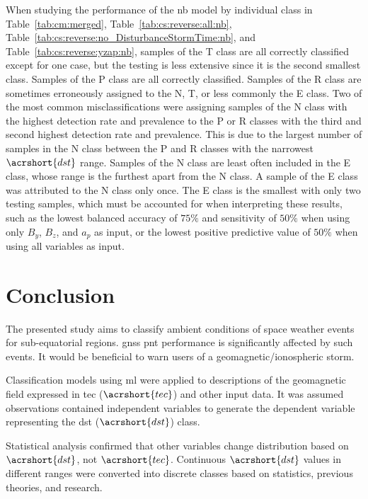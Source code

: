 \documentclass[sn-mathphys-num]{sn-jnl}%
\begin{document}
When studying the performance of the \acrshort{nb} model by individual class in Table~\ref{tab:cm:merged}, Table~\ref{tab:cs:reverse:all:nb}, Table~\ref{tab:cs:reverse:no_DisturbanceStormTime:nb}, and Table~\ref{tab:cs:reverse:yzap:nb}, samples of the T class are all correctly classified except for one case, but the testing is less extensive since it is the second smallest class. Samples of the P class are all correctly classified. Samples of the R class are sometimes erroneously assigned to the N, T, or less commonly the E class. Two of the most common misclassifications were assigning samples of the N class with the highest detection rate and prevalence to the P or R classes with the third and second highest detection rate and prevalence. This is due to the largest number of samples in the N class between the P and R classes with the narrowest $\acrshort{dst}$ range. Samples of the N class are least often included in the E class, whose range is the furthest apart from the N class. A sample of the E class was attributed to the N class only once. The E class is the smallest with only two testing samples, which must be accounted for when interpreting these results, such as the lowest balanced accuracy of $75\%$ and sensitivity of $50\%$ when using only $B_{y}$, $B_{z}$, and $a_{p}$ as input, or the lowest positive predictive value of $50\%$ when using all variables as input.

\section{Conclusion}
\label{sec:Conclusion}

The presented study aims to classify ambient conditions of space weather events for sub-equatorial regions. \acrfull{gnss} \acrfull{pnt} performance is significantly affected by such events. It would be beneficial to warn users of a geomagnetic/ionospheric storm.

Classification models using \acrlong{ml} were applied to descriptions of the geomagnetic field expressed in \acrlong{tec} ($\acrshort{tec}$) and other input data. It was assumed observations contained independent variables to generate the dependent variable representing the \acrlong{dst} ($\acrshort{dst}$) class. 

Statistical analysis confirmed that other variables change distribution based on $\acrshort{dst}$, not $\acrshort{tec}$. Continuous $\acrshort{dst}$ values in different ranges were converted into discrete classes based on statistics, previous theories, and research. 
\end{document}
